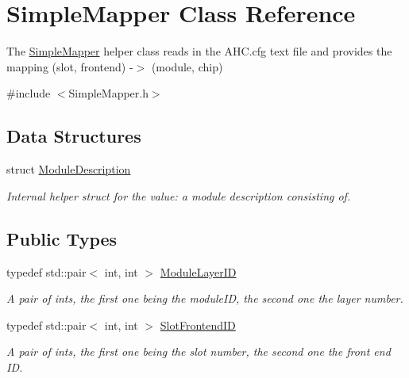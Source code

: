 \hypertarget{class_simple_mapper}{\section{Simple\-Mapper Class Reference}
\label{class_simple_mapper}
}


The \hyperlink{class_simple_mapper}{Simple\-Mapper} helper class reads in the A\-H\-C.\-cfg text file and provides the mapping (slot, frontend) -\/$>$ (module, chip)  




{\ttfamily \#include $<$Simple\-Mapper.\-h$>$}

\subsection*{Data Structures}
\begin{DoxyCompactItemize}
\item 
struct \hyperlink{struct_simple_mapper_1_1_module_description}{Module\-Description}
\begin{DoxyCompactList}\small\item\em Internal helper struct for the value\-: a module description consisting of. \end{DoxyCompactList}\end{DoxyCompactItemize}
\subsection*{Public Types}
\begin{DoxyCompactItemize}
\item 
typedef std\-::pair$<$ int, int $>$ \hyperlink{class_simple_mapper_a6fbef133414fb482f870ab56e7237682}{Module\-Layer\-I\-D}
\begin{DoxyCompactList}\small\item\em A pair of ints, the first one being the module\-I\-D, the second one the layer number. \end{DoxyCompactList}\item 
typedef std\-::pair$<$ int, int $>$ \hyperlink{class_simple_mapper_a2b973730223591df7c876a6dfbb922a0}{Slot\-Frontend\-I\-D}
\begin{DoxyCompactList}\small\item\em A pair of ints, the first one being the slot number, the second one the front end I\-D. \end{DoxyCompactList}\end{DoxyCompactItemize}
